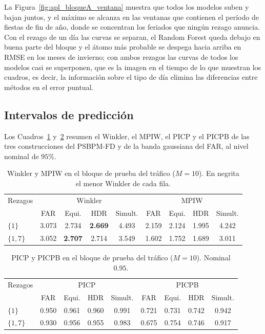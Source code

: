 La Figura~\ref{fig:apl_bloqueA_ventana} muestra que todos los modelos suben y bajan juntos, y el máximo se alcanza en las ventanas que contienen el período de fiestas de fin de año, donde se concentran los feriados que ningún rezago anuncia. Con el rezago de un día las curvas se separan, el Random Forest queda debajo en buena parte del bloque y el átomo más probable se despega hacia arriba en RMSE en los meses de invierno; con ambos rezagos las curvas de todos los modelos casi se superponen, que es la imagen en el tiempo de lo que muestran los cuadros, es decir, la información sobre el tipo de día elimina las diferencias entre métodos en el error puntual.

\subsection{Intervalos de predicción}
\label{04_03_02_intervalos}

Los Cuadros~\ref{tab:apl_bloqueB_winkler} y~\ref{tab:apl_bloqueB_picp} resumen el Winkler, el MPIW, el PICP y el PICPB de las tres construcciones del PSBPM-FD y de la banda gaussiana del FAR, al nivel nominal de $95\%$.

\begin{table}[H]
\centering\small
\setlength{\tabcolsep}{3.5pt}
\caption{Winkler y MPIW en el bloque de prueba del tráfico ($M = 10$). En negrita el menor Winkler de cada fila.}
\label{tab:apl_bloqueB_winkler}
\begin{tabular}{l cccc cccc}
\hline
Rezagos & \multicolumn{4}{c}{Winkler} & \multicolumn{4}{c}{MPIW} \\
 & FAR & Equi. & HDR & Simult. & FAR & Equi. & HDR & Simult. \\
\hline
$\{1\}$ & 3.073 & 2.734 & \textbf{2.669} & 4.493 & 2.159 & 2.124 & 1.995 & 4.242 \\
$\{1,7\}$ & 3.052 & \textbf{2.707} & 2.714 & 3.549 & 1.602 & 1.752 & 1.689 & 3.011 \\
\hline
\end{tabular}
\end{table}

\begin{table}[H]
\centering\small
\setlength{\tabcolsep}{3.5pt}
\caption{PICP y PICPB en el bloque de prueba del tráfico ($M = 10$). Nominal $0.95$.}
\label{tab:apl_bloqueB_picp}
\begin{tabular}{l cccc cccc}
\hline
Rezagos & \multicolumn{4}{c}{PICP} & \multicolumn{4}{c}{PICPB} \\
 & FAR & Equi. & HDR & Simult. & FAR & Equi. & HDR & Simult. \\
\hline
$\{1\}$ & 0.950 & 0.961 & 0.960 & 0.991 & 0.721 & 0.731 & 0.742 & 0.942 \\
$\{1,7\}$ & 0.930 & 0.956 & 0.955 & 0.983 & 0.675 & 0.754 & 0.746 & 0.917 \\
\hline
\end{tabular}
\end{table}

